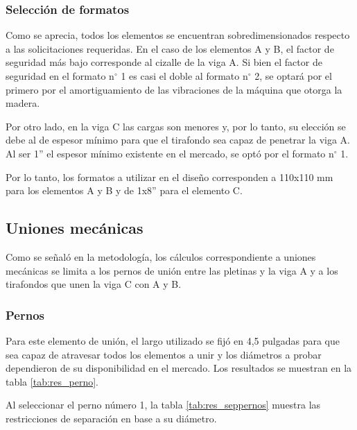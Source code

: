 \subsubsection{Selección de formatos}
Como se aprecia, todos los elementos se encuentran sobredimensionados respecto a las solicitaciones requeridas. En el caso de los elementos A y B, el factor de seguridad más bajo corresponde al cizalle de la viga A. Si bien el factor de seguridad en el formato n$^{\circ}$ 1 es casi el doble al formato n$^{\circ}$ 2, se optará por el primero por el amortiguamiento de las vibraciones de la máquina que otorga la madera.

Por otro lado, en la viga C las cargas son menores y, por lo tanto, su elección se debe al de espesor mínimo para que el tirafondo sea capaz de penetrar la viga A. Al ser 1'' el espesor mínimo existente en el mercado, se optó por el formato n$^{\circ}$ 1.

Por lo tanto, los formatos a utilizar en el diseño corresponden a 110x110 mm para los elementos A y B y de 1x8'' para el elemento C.

\subsection{Uniones mecánicas}

Como se señaló en la metodología, los cálculos correspondiente a uniones mecánicas se limita a los pernos de unión entre las pletinas y la viga A y a los tirafondos que unen la viga C con A y B.

\subsubsection{Pernos}
Para este elemento de unión, el largo utilizado se fijó en 4,5 pulgadas para que sea capaz de atravesar todos los elementos a unir y los diámetros a probar dependieron de su disponibilidad en el mercado. Los resultados se muestran en la tabla \ref{tab:res_perno}. 

Al seleccionar el perno número 1, la tabla \ref{tab:res_seppernos} muestra las restricciones de separación en base a su diámetro.

\begin{table}[h]
\centering
{}
\caption{Cargas admisibles y factor de seguridad para distintos pernos hexagonales.}
\label{tab:res_perno}
\end{table}

